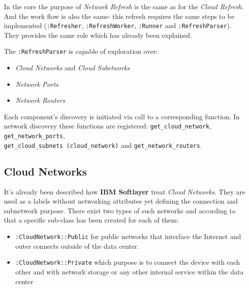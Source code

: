 In the core the purpose of \emph{Network Refresh} is the same as for the \emph{Cloud Refresh}. And the work flow is also the same: this refresh requires the same steps to be implemented (\texttt{:Refresher}, \texttt{:RefreshWorker}, \texttt{:Runner} and \texttt{:RefreshParser}). They provides the same role which has already been explained.

The \texttt{:RefreshParser} is capable of exploration over:

\begin{itemize}
	\item \emph{Cloud Networks} and \emph{Cloud Subetworks}
	\item \emph{Network Ports}
	\item \emph{Network Routers}
\end{itemize}

Each component's discovery is initiated via call to a corresponding function. In network discovery these functions are registered: \texttt{get\_cloud\_network}, \texttt{get\_network\_ports}, \\ \texttt{get\_cloud\_subnets\,(cloud\_network)} and \texttt{get\_network\_routers}.

\subsection{Cloud Networks}
\label{sub:Cloud Networks}

It's already been described how \textbf{IBM Softlayer} treat \emph{Cloud Networks}. They are used as a labels without networking attributes yet defining the connection and subnetwork purpose. There exist two types of such networks and according to that a specific sub-class has been created for each of them:

\begin{itemize}
	\item \texttt{:CloudNetwork::Public} for public networks that interface the Internet and outer connects outside of the data center.
	\item \texttt{:CloudNetwork::Private} which purpose is to connect the device with each other and with network storage or any other internal service within the data center
\end{itemize}

